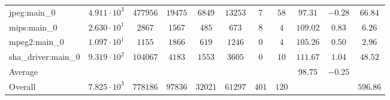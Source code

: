\begin{tabular}{|l|c|c|c|c|c|c|c|c|c|c|}
jpeg:main\_0            & $ 4.911 \cdot 10^{3} $ & $ 477956 $ & $ 19475 $ & $ 6849  $ & $ 13253 $ & $ 7   $ & $ 58  $ & $ 97.31       $ & $ -0.28   $ & $ 66.84   $ \\
mips:main\_0            & $ 2.630 \cdot 10^{1} $ & $ 2867   $ & $ 1567  $ & $ 485   $ & $ 673   $ & $ 8   $ & $ 4   $ & $ 109.02      $ & $ 0.83    $ & $ 6.26    $ \\
mpeg2:main\_0           & $ 1.097 \cdot 10^{1} $ & $ 1155   $ & $ 1866  $ & $ 619   $ & $ 1246  $ & $ 0   $ & $ 4   $ & $ 105.26      $ & $ 0.50    $ & $ 2.96    $ \\
sha\_driver:main\_0     & $ 9.319 \cdot 10^{2} $ & $ 104067 $ & $ 4183  $ & $ 1553  $ & $ 3605  $ & $ 0   $ & $ 10  $ & $ 111.67      $ & $ 1.04    $ & $ 48.52   $ \\
\hline
Average                 & $                    $ & $        $ & $       $ & $       $ & $       $ & $     $ & $     $ & $ 98.75       $ & $ -0.25   $ & $         $ \\
\hline
Overall                 & $ 7.825 \cdot 10^{3} $ & $ 778186 $ & $ 97836 $ & $ 32021 $ & $ 61297 $ & $ 401 $ & $ 120 $ & $             $ & $         $ & $ 596.86  $ \\
\hline
\end{tabular}
